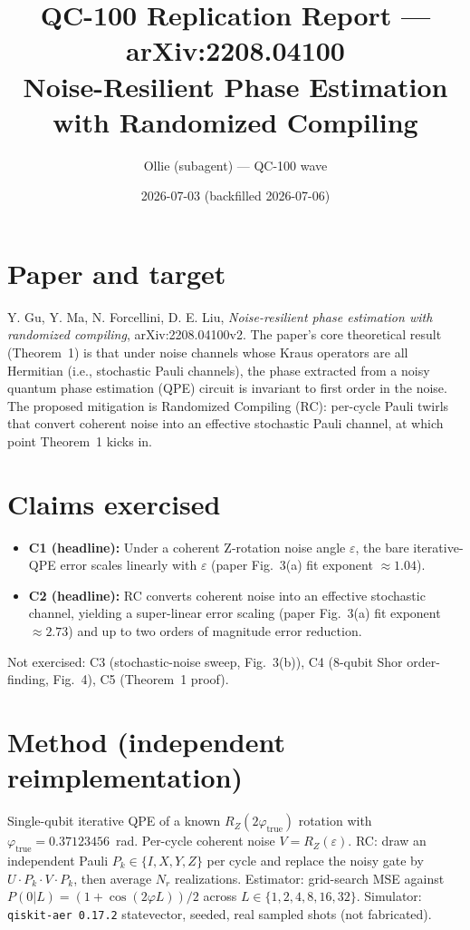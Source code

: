 \documentclass[11pt]{article}
\title{QC-100 Replication Report --- arXiv:2208.04100\\
\large Noise-Resilient Phase Estimation with Randomized Compiling}
\author{Ollie (subagent) --- QC-100 wave}
\date{2026-07-03 (backfilled 2026-07-06)}
\begin{document}
\maketitle

\section{Paper and target}
Y. Gu, Y. Ma, N. Forcellini, D. E. Liu, \emph{Noise-resilient phase estimation with randomized compiling}, arXiv:2208.04100v2. The paper's core theoretical result (Theorem~1) is that under noise channels whose Kraus operators are all Hermitian (i.e., stochastic Pauli channels), the phase extracted from a noisy quantum phase estimation (QPE) circuit is invariant to first order in the noise. The proposed mitigation is Randomized Compiling (RC): per-cycle Pauli twirls that convert coherent noise into an effective stochastic Pauli channel, at which point Theorem~1 kicks in.

\section{Claims exercised}
\begin{itemize}
  \item \textbf{C1 (headline):} Under a coherent Z-rotation noise angle $\varepsilon$, the bare iterative-QPE error scales linearly with $\varepsilon$ (paper Fig.~3(a) fit exponent $\approx 1.04$).
  \item \textbf{C2 (headline):} RC converts coherent noise into an effective stochastic channel, yielding a super-linear error scaling (paper Fig.~3(a) fit exponent $\approx 2.73$) and up to two orders of magnitude error reduction.
\end{itemize}
Not exercised: C3 (stochastic-noise sweep, Fig.~3(b)), C4 (8-qubit Shor order-finding, Fig.~4), C5 (Theorem~1 proof).

\section{Method (independent reimplementation)}
Single-qubit iterative QPE of a known $R_Z(2\varphi_{\text{true}})$ rotation with $\varphi_{\text{true}}=0.37123456$~rad. Per-cycle coherent noise $V=R_Z(\varepsilon)$. RC: draw an independent Pauli $P_k\in\{I,X,Y,Z\}$ per cycle and replace the noisy gate by $U\cdot P_k\cdot V\cdot P_k$, then average $N_r$ realizations. Estimator: grid-search MSE against $P(0|L)=(1+\cos(2\varphi L))/2$ across $L\in\{1,2,4,8,16,32\}$. Simulator: \texttt{qiskit-aer 0.17.2} statevector, seeded, real sampled shots (not fabricated).
\end{document}
